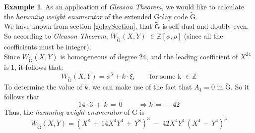 \documentclass[12pt]{article}
\theoremstyle{definition}
\newtheorem{example}[theorem]{Example}
\numberwithin{equation}{theorem}
\numberwithin{figure}{theorem}
\newcommand{\cCodes}{\ensuremath{\widetilde{\mathrm{G}}}}
\newcommand{\weightEnumerator}[3]{\ensuremath{W_{#1}(#2,#3)}}
\newcommand{\Integer}{\ensuremath{\mathbb{Z}}}
\begin{document}
\begin{example}\label{golayEnumerExample}
As an application of \emph{Gleason Theorem}, we would like to calculate the \emph{hamming weight enumerator} of the extended Golay code {\cCodes}.\\
We have known from section \ref{golaySection}, that {\cCodes} is self-dual and doubly even. So according to \emph{Gleason Theorem}, {\weightEnumerator{\cCodes}{X}{Y}} $\in \Integer[\phi,\rho]$ (since all the coefficients must be integer).\\
Since {\weightEnumerator{\cCodes}{X}{Y}} is homogeneous of degree 24, and the leading coefficient of $X^{24}$ is 1, it follows that:
\[
	\weightEnumerator{\cCodes}{X}{Y} = \phi^3 + k \cdot \xi, \quad \quad \mbox{for some k $\in \Integer$}
\]
To determine the value of $k$, we can make use of the fact that $A_4 = 0$ in $\cCodes$. So it follows that 
\[
	14 \cdot 3 \,+\, k \, =\, 0 \qquad \; \Rightarrow k \,=\, -42
\]
Thus, the \emph{hamming weight enumerator} of {\cCodes} is 
\[
	\weightEnumerator{\cCodes}{X}{Y} = (X^8 \,+ \, 14X^4 Y^4 \,+\, Y^8) ^3 \; - \; 42 X^4Y^4 \,(X^4 \, - \, Y^4)^4
\]
\end{example}
\end{document}
